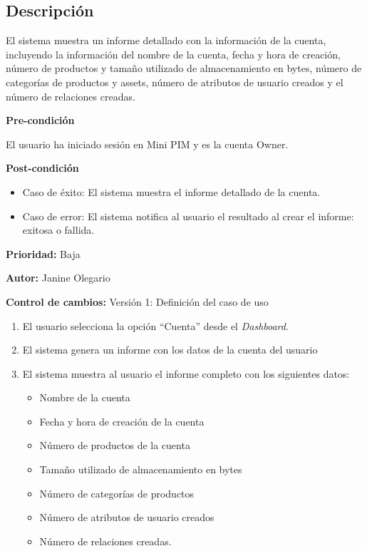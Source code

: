 
\subsection*{Descripción}
El sistema muestra un informe detallado con la información de la cuenta, incluyendo la información del
nombre de la cuenta, fecha y hora de creación, número de productos y tamaño utilizado de almacenamiento
en bytes, número de categorías de productos y assets, número de atributos de usuario
creados y el número de relaciones creadas.

\vspace{0.15cm}

\textbf{Pre-condición}\par
El usuario ha iniciado sesión en Mini PIM y es la cuenta Owner.\par
\vspace{0.15cm}

\textbf{Post-condición}
\begin{itemize}
    \item Caso de éxito: El sistema muestra el informe detallado de la cuenta.
    \item Caso de error: El sistema notifica al usuario el resultado al crear el informe: exitosa o fallida.
\end{itemize}

\textbf{Prioridad:}
Baja
\vspace{0.15cm}

\textbf{Autor: }
Janine Olegario\par
\vspace{0.15cm}

\textbf{Control de cambios: } Versión 1: Definición del caso de uso

\begin{enumerate}
    \item El usuario selecciona la opción \enquote{Cuenta} desde el \textit{Dashboard}.
    \item El sistema genera un informe con los datos de la cuenta del usuario
    \item El sistema muestra al usuario el informe completo con los siguientes datos:
        \begin{itemize}
            \item Nombre de la cuenta
            \item Fecha y hora de creación de la cuenta
            \item Número de productos de la cuenta
            \item Tamaño utilizado de almacenamiento en bytes
            \item Número de categorías de productos
            \item Número de atributos de usuario creados
            \item Número de relaciones creadas.
        \end{itemize}
\end{enumerate}

